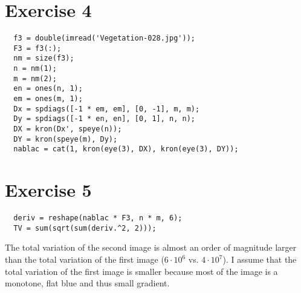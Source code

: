 \documentclass[10pt,a4paper]{article}
\begin{document}
\section*{Exercise 4}

\begin{verbatim}
  f3 = double(imread('Vegetation-028.jpg'));
  F3 = f3(:);
  nm = size(f3);
  n = nm(1);
  m = nm(2);
  en = ones(n, 1);
  em = ones(m, 1);
  Dx = spdiags([-1 * em, em], [0, -1], m, m);
  Dy = spdiags([-1 * en, en], [0, 1], n, n);
  DX = kron(Dx', speye(n));
  DY = kron(speye(m), Dy);
  nablac = cat(1, kron(eye(3), DX), kron(eye(3), DY));
\end{verbatim}

\section*{Exercise 5}

\begin{verbatim}
  deriv = reshape(nablac * F3, n * m, 6);
  TV = sum(sqrt(sum(deriv.^2, 2)));
\end{verbatim}

The total variation of the second image is almost an order of magnitude larger than the total variation of the first image ($6 \cdot 10^{6}$ vs. $4 \cdot 10^{7}$).
I assume that the total variation of the first image is smaller because most of the image is a monotone, flat blue and thus small gradient.
\end{document}
